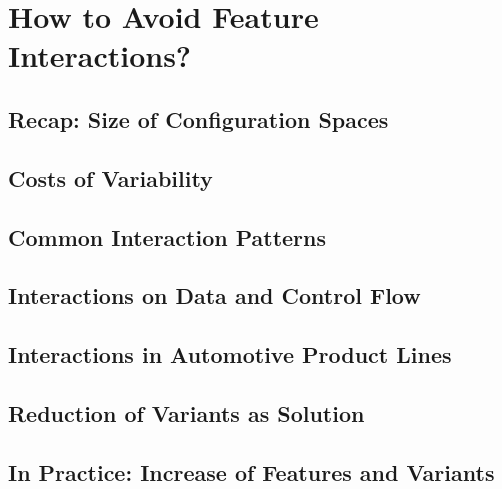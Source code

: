 \documentclass[
	aspectratio=169, %
	8pt, %
	handout, %
]{beamer}
\begin{document}
\sectionend

\section{How to Avoid Feature Interactions?}

\subsection{Recap: Size of Configuration Spaces}
\subsection{Costs of Variability}
\subsection{Common Interaction Patterns}
\subsection{Interactions on Data and Control Flow}
\subsection{Interactions in Automotive Product Lines}
\subsection{Reduction of Variants as Solution}
\begin{frame}{\insertsubsection}
\end{frame}

\subsection{In Practice: Increase of Features and Variants}
\end{document}
